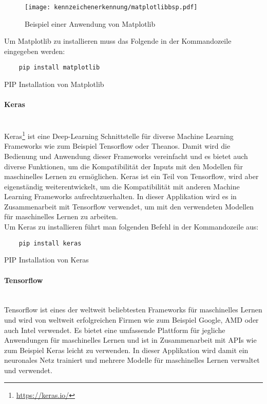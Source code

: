 \begin{figure}[H]
    \centering
    \texttt{[image: kennzeichenerkennung/matplotlibbsp.pdf]}
    \caption{Beispiel einer Anwendung von Matplotlib}
\end{figure}

Um Matplotlib zu installieren muss das Folgende in der Kommandozeile eingegeben werden:

\begin{listing}[H]
    \begin{verbatim}
    pip install matplotlib
    \end{verbatim}
    \caption{PIP Installation von Matplotlib}
\end{listing}

\paragraph{Keras}\mbox{}\\
Keras\footnote{\url{https://keras.io/}} ist eine Deep-Learning Schnittstelle für diverse Machine Learning Frameworks wie zum Beispiel Tensorflow oder Theanos. 
Damit wird die Bedienung und Anwendung dieser Frameworks vereinfacht und es bietet auch diverse Funktionen, um die Kompatibilität der Inputs mit 
den Modellen für maschinelles Lernen zu ermöglichen. Keras ist ein Teil von Tensorflow, wird aber eigenständig weiterentwickelt, 
um die Kompatibilität mit anderen Machine Learning Frameworks aufrechtzuerhalten. In dieser Applikation wird es in 
Zusammenarbeit mit Tensorflow verwendet, um mit den verwendeten Modellen für maschinelles Lernen zu arbeiten.\\

Um Keras zu installieren führt man folgenden Befehl in der Kommandozeile aus:

\begin{listing}[H]
    \begin{verbatim}
    pip install keras
    \end{verbatim}
    \caption{PIP Installation von Keras}
\end{listing}

\paragraph{Tensorflow}\mbox{}\\
Tensorflow ist eines der weltweit beliebtesten Frameworks für maschinelles Lernen und wird von weltweit erfolgreichen Firmen wie 
zum Beispiel Google, AMD oder auch Intel verwendet. Es bietet eine umfassende Plattform für jegliche Anwendungen für maschinelles Lernen 
und ist in Zusammenarbeit mit APIs wie zum Beispiel Keras leicht zu verwenden. In dieser Applikation wird damit ein neuronales 
Netz trainiert und mehrere Modelle für maschinelles Lernen verwaltet und verwendet.\\

